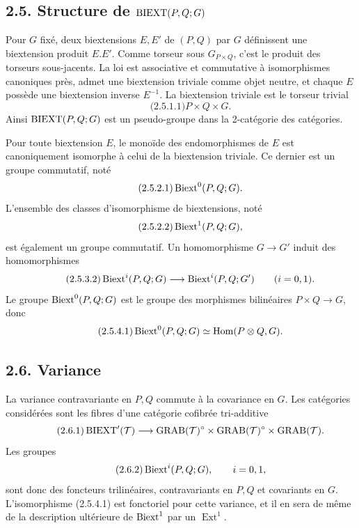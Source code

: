 \documentclass[11pt]{article}
\providecommand{\Ext}{\operatorname{Ext}}
\begin{document}
\subsection*{2.5. Structure de \(\operatorname{BIEXT}(P,Q;G)\)}
Pour \(G\) fixé, deux biextensions \(E,E'\) de \((P,Q)\) par \(G\) définissent une biextension produit \(E.E'\).  Comme torseur sous \(G_{P\times Q}\), c'est le produit des torseurs sous-jacents.  La loi est associative et commutative à isomorphismes canoniques près, admet une biextension triviale comme objet neutre, et chaque \(E\) possède une biextension inverse \(E^{-1}\).  La biextension triviale est le torseur trivial
\begin{equation}\qquad\text{(2.5.1.1)}
  P\times Q\times G.
\end{equation}
Ainsi \(\operatorname{BIEXT}(P,Q;G)\) est un pseudo-groupe dans la 2-catégorie des catégories.

Pour toute biextension \(E\), le monoïde des endomorphismes de \(E\) est canoniquement isomorphe à celui de la biextension triviale.  Ce dernier est un groupe commutatif, noté
\begin{equation}\qquad\text{(2.5.2.1)}
  \operatorname{Biext}^0(P,Q;G).
\end{equation}
L'ensemble des classes d'isomorphisme de biextensions, noté
\begin{equation}\qquad\text{(2.5.2.2)}
  \operatorname{Biext}^1(P,Q;G),
\end{equation}
est également un groupe commutatif.  Un homomorphisme \(G\to G'\) induit des homomorphismes
\begin{equation}\qquad\text{(2.5.3.2)}
  \operatorname{Biext}^i(P,Q;G)\longrightarrow\operatorname{Biext}^i(P,Q;G')\qquad(i=0,1).
\end{equation}
Le groupe \(\operatorname{Biext}^0(P,Q;G)\) est le groupe des morphismes bilinéaires \(P\times Q\to G\), donc
\begin{equation}\qquad\text{(2.5.4.1)}
  \operatorname{Biext}^0(P,Q;G)\simeq\operatorname{Hom}(P\otimes Q,G).
\end{equation}

\subsection*{2.6. Variance}
La variance contravariante en \(P,Q\) commute à la covariance en \(G\).  Les catégories considérées sont les fibres d'une catégorie cofibrée tri-additive
\begin{equation}\qquad\text{(2.6.1)}
  \operatorname{BIEXT}'(\mathcal T)\longrightarrow
  \operatorname{GRAB}(\mathcal T)^\circ\times\operatorname{GRAB}(\mathcal T)^\circ\times\operatorname{GRAB}(\mathcal T).
\end{equation}
Les groupes
\begin{equation}\qquad\text{(2.6.2)}
  \operatorname{Biext}^i(P,Q;G),\qquad i=0,1,
\end{equation}
sont donc des foncteurs trilinéaires, contravariants en \(P,Q\) et covariants en \(G\).  L'isomorphisme (2.5.4.1) est fonctoriel pour cette variance, et il en sera de même de la description ultérieure de \(\operatorname{Biext}^1\) par un \(\Ext^1\).
\end{document}
